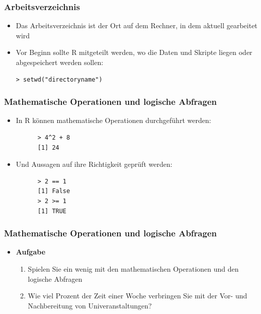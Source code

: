\documentclass{beamer}
\begin{document}
\begin{frame}[fragile]
  \frametitle{Arbeitsverzeichnis}
  \begin{itemize}
    \item Das Arbeitsverzeichnis ist der Ort auf dem Rechner, in dem aktuell gearbeitet wird
    \item Vor Beginn sollte R mitgeteilt werden, wo die Daten und Skripte liegen oder abgespeichert werden sollen:
    \begin{Verbatim}[firstnumber=1]
       > setwd("directoryname")
    \end{Verbatim}
  \end{itemize}
\end{frame}

\begin{frame}[fragile]
  \frametitle{Mathematische Operationen und logische Abfragen}
  \begin{itemize}
    \item In R können mathematische Operationen durchgeführt werden:
    \begin{Verbatim}
      > 4^2 + 8
      [1] 24
    \end{Verbatim}
      \item Und Aussagen auf ihre Richtigkeit geprüft werden:
    \begin{Verbatim}
      > 2 == 1
      [1] False
      > 2 >= 1
      [1] TRUE
    \end{Verbatim}
  \end{itemize}
\end{frame}

\begin{frame}[fragile]
  \frametitle{Mathematische Operationen und logische Abfragen}
  \begin{itemize}
    \item \textbf{Aufgabe} \\ 
         \begin{enumerate}
      		\item Spielen Sie ein wenig mit den mathematischen Operationen und den logische Abfragen
      		\item Wie viel Prozent der Zeit einer Woche verbringen Sie mit der Vor- und Nachbereitung von Univeranstaltungen?
    \end{enumerate}
  \end{itemize}
\end{frame}
\end{document}
